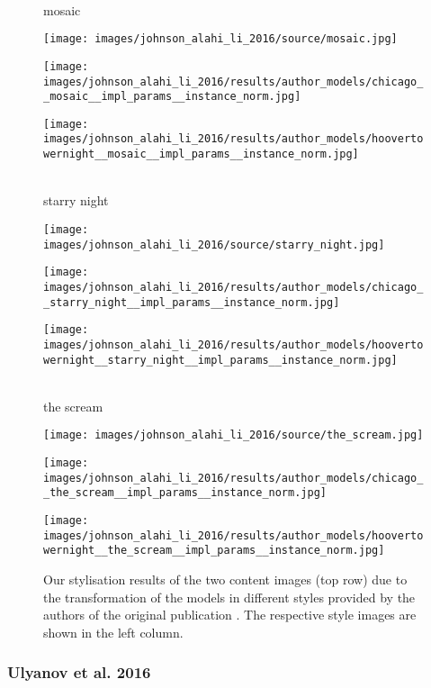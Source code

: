 \begin{figure}[H]
	\hfill \\ mosaic \hfill \\
	\begin{minipage}[t]{0.3\textwidth}
		\centering
		\texttt{[image: images/johnson\_alahi\_li\_2016/source/mosaic.jpg]}
	\end{minipage}
	\hfill%
	\begin{minipage}[t]{0.3\textwidth}
		\centering
		\texttt{[image: images/johnson\_alahi\_li\_2016/results/author\_models/chicago\_\_mosaic\_\_impl\_params\_\_instance\_norm.jpg]}
	\end{minipage}
	\hfill%
	\begin{minipage}[t]{0.3\textwidth}
		\centering
		\texttt{[image: images/johnson\_alahi\_li\_2016/results/author\_models/hoovertowernight\_\_mosaic\_\_impl\_params\_\_instance\_norm.jpg]}
	\end{minipage}
	\hfill \\ starry night \hfill \\
	\begin{minipage}[t]{0.3\textwidth}
		\centering
		\texttt{[image: images/johnson\_alahi\_li\_2016/source/starry\_night.jpg]}
	\end{minipage}
	\hfill%
	\begin{minipage}[t]{0.3\textwidth}
		\centering
		\texttt{[image: images/johnson\_alahi\_li\_2016/results/author\_models/chicago\_\_starry\_night\_\_impl\_params\_\_instance\_norm.jpg]}
	\end{minipage}
	\hfill%
	\begin{minipage}[t]{0.3\textwidth}
		\centering
		\texttt{[image: images/johnson\_alahi\_li\_2016/results/author\_models/hoovertowernight\_\_starry\_night\_\_impl\_params\_\_instance\_norm.jpg]}
	\end{minipage}
	\hfill \\ the scream \hfill \\
	\begin{minipage}[t]{0.3\textwidth}
		\centering
		\texttt{[image: images/johnson\_alahi\_li\_2016/source/the\_scream.jpg]}
	\end{minipage}
	\hfill%
	\begin{minipage}[t]{0.3\textwidth}
		\centering
		\texttt{[image: images/johnson\_alahi\_li\_2016/results/author\_models/chicago\_\_the\_scream\_\_impl\_params\_\_instance\_norm.jpg]}
	\end{minipage}
	\hfill%
	\begin{minipage}[t]{0.3\textwidth}
		\centering
		\texttt{[image: images/johnson\_alahi\_li\_2016/results/author\_models/hoovertowernight\_\_the\_scream\_\_impl\_params\_\_instance\_norm.jpg]}
	\end{minipage}
	\label{fig:johnson_alahi_li_2016_author_model_appendix}
	\caption{Our stylisation results of the two content images (top row) due to the transformation of the models in different styles provided by the authors of the original publication \cite{JAL2016}. The respective style images are shown in the left column.}
\end{figure}

\subsubsection{Ulyanov et al. 2016}



